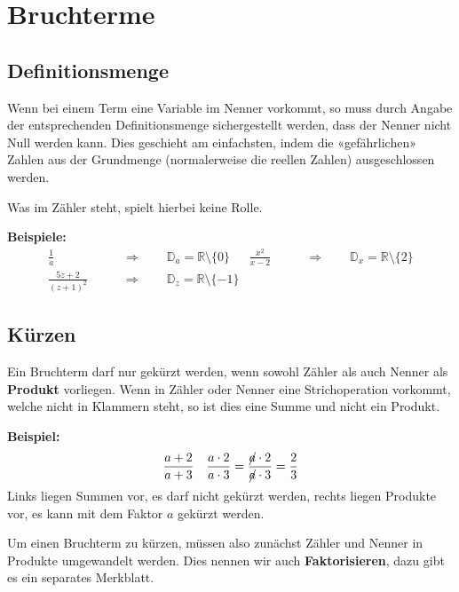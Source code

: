 \newpage
\section{Bruchterme}

\subsection{Definitionsmenge}
Wenn bei einem Term eine Variable im Nenner vorkommt, so muss durch Angabe der entsprechenden Definitionsmenge sichergestellt werden, dass der Nenner nicht Null werden kann. Dies geschieht am einfachsten, indem die «gefährlichen» Zahlen aus der Grundmenge (normalerweise die reellen Zahlen) ausgeschlossen werden.

Was im Zähler steht, spielt hierbei keine Rolle.
\begin{example}
  \textbf{Beispiele:}
  \begin{align*}
    \frac{1}{a} &\qquad\Rightarrow\qquad \mathbb{D}_{a} = \mathbb{R} \setminus \{0\} &
    \frac{x^{2}}{x-2} &\qquad\Rightarrow\qquad \mathbb{D}_{x} = \mathbb{R} \setminus \{2\} \\[4mm]
    \frac{5z+2}{(z+1)^{2}} &\qquad\Rightarrow\qquad \mathbb{D}_{z} = \mathbb{R} \setminus \{-1\}
  \end{align*}
\end{example}

\subsection{Kürzen}
Ein Bruchterm darf nur gekürzt werden, wenn sowohl Zähler als auch Nenner als \textbf{Produkt} vorliegen. Wenn in Zähler oder Nenner eine Strichoperation vorkommt, welche nicht in Klammern steht, so ist dies eine Summe und nicht ein Produkt.
\begin{example}
  \textbf{Beispiel:}
  \begin{align*}
    \frac{a+2}{a+3} && \frac{a\cdot 2}{a\cdot 3} = \frac{\cancel{a}\cdot 2}{\cancel{a}\cdot 3}= \frac{2}{3}
  \end{align*}
  Links liegen Summen vor, es darf nicht gekürzt werden, rechts liegen Produkte vor, es kann mit dem Faktor $a$ gekürzt werden.
\end{example}

Um einen Bruchterm zu kürzen, müssen also zunächst Zähler und Nenner in Produkte umgewandelt werden. Dies nennen wir auch \textbf{Faktorisieren}, dazu gibt es ein separates Merkblatt.

